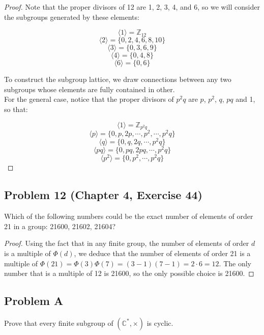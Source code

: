 \documentclass{article}
\begin{document}
\begin{proof}

Note that the proper divisors of 12 are 1, 2, 3, 4, and 6, so we will consider the subgroups generated by these elements:

\[ \langle 1 \rangle = \mathbb{Z}_{12}\]
\[ \langle 2 \rangle = \{0, 2, 4, 6, 8, 10\}\]
\[ \langle 3 \rangle = \{0, 3, 6, 9\}\]
\[ \langle 4 \rangle = \{0, 4, 8\}\]
\[ \langle 6 \rangle = \{0, 6\}\]

To construct the subgroup lattice, we draw connections between any two subgroups whose elements are fully contained in other. \\

For the general case, notice that the proper divisors of $p^2q$ are $p$, $p^2$, $q$, $pq$ and 1, so that:

\[ \langle 1 \rangle = \mathbb{Z}_{p^2q}\]
\[ \langle p \rangle = \{0, p, 2p, \cdots, p^2, \cdots, p^2q\}\]
\[ \langle q \rangle = \{0, q, 2q, \cdots, p^2q\}\]
\[ \langle pq \rangle = \{0, pq, 2pq, \cdots, p^2q\}\]
\[ \langle p^2 \rangle = \{0, p^2, \cdots, p^2q\}\]


\end{proof}

\subsection*{Problem 12 (Chapter 4, Exercise 44)}
Which of the following numbers could be the exact number of elements of order 21 in a group: 21600, 21602, 21604?

\begin{proof}

Using the fact that in any finite group, the number of elements of order $d$ is a multiple of $\Phi{(d)}$, we deduce that the number of elements of order 21 is a multiple of $\Phi{(21)} = \Phi{(3)}\Phi{(7)} = (3-1)(7-1) = 2 \cdot 6 = 12$. The only number that is a multiple of 12 is 21600, so the only possible choice is 21600.

\end{proof}

\subsection*{Problem A}
Prove that every finite subgroup of $\left(\mathbb{C}^{\ast},\times\right)$ is cyclic.
\end{document}
